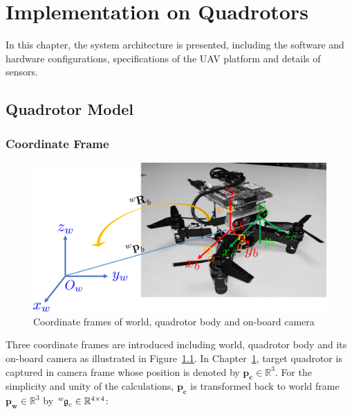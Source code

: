 \chapter{Implementation on Quadrotors}\label{implementation}

In this chapter, the system architecture is presented, including the software and hardware configurations, specifications of the UAV platform and details of sensors.

\section{Quadrotor Model}

\subsection{Coordinate Frame}

\begin{figure}[htb]
  \centering
  \includegraphics[width=1.0\textwidth]{figure/chapter_4/coordinate.png}
  \caption{Coordinate frames of world, quadrotor body and on-board camera}
  \label{fig:coordinate}
\end{figure}

Three coordinate frames are introduced including world, quadrotor body and its on-board camera as illustrated in Figure~\ref{fig:coordinate}. In Chapter~\ref{implementation}, target quadrotor is captured in camera frame whose position is denoted by $\mathbf{p_c}\in\mathbb{R}^3$. For the simplicity and unity of the calculations, $\mathbf{p_c}$ is transformed back to world frame $\mathbf{p_w}\in\mathbb{R}^3$ by $\tensor*[^w]{\mathfrak{g}}{_c}\in\mathbb{R}^{4\times4}$:

